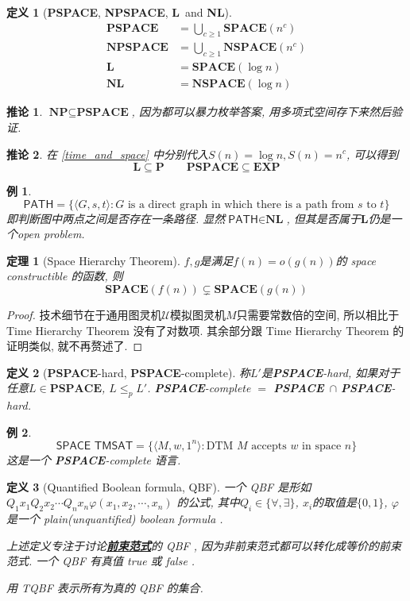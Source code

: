 \documentclass[8pt]{article}
\theoremstyle{compact}
\newtheorem{theorem}{定理}
\newtheorem{definition}{定义}
\newtheorem{corollary}{推论}
\newtheorem{example}{例}
\def\obj#1{\textbf{\uline{#1}}}
\def\le{\leqslant}
\def\ge{\geqslant}
\def\P{\textbf{P}}
\def\NP{\textbf{NP}}
\def\EXP{\textbf{EXP}}
\def\SPACE{\textbf{SPACE}}
\def\NSPACE{\textbf{NSPACE}}
\def\PSPACE{\textbf{PSPACE}}
\def\NPSPACE{\textbf{NPSPACE}}
\def\L{\textbf{L}}
\def\NL{\textbf{NL}}
\begin{document}
\begin{definition}[\PSPACE, \NPSPACE, \L \ and \NL]
	\begin{align*}
		\PSPACE &= \bigcup_{c \ge 1}\SPACE(n^c)\\
		\NPSPACE &= \bigcup_{c \ge 1}\NSPACE(n^c)\\
		\L &= \SPACE(\log n)\\
		\NL &= \NSPACE(\log n)
	\end{align*}
\end{definition}
\begin{corollary}
	$\NP \subseteq \PSPACE$, 因为都可以暴力枚举答案, 用多项式空间存下来然后验证. 
\end{corollary}
\begin{corollary}
	在 \cref{time_and_space} 中分别代入$S(n) = \log n, S(n) = n^c$, 可以得到
	$$\L \subseteq \P\qquad \PSPACE \subseteq \EXP$$
\end{corollary}
\begin{example}
	$$\textsf{PATH} = \{ \langle G, s, t\rangle : G \textrm{ is a direct graph in which there is a path from }s \textrm{ to } t\}$$
	即判断图中两点之间是否存在一条路径. 显然$\textsf{PATH} \in \NL$, 但其是否属于$\L$仍是一个open problem. 
\end{example}
\begin{theorem}[Space Hierarchy Theorem]
	$f, g$是满足$f(n) = o(g(n))$的 space constructible 的函数, 则
	$$\SPACE(f(n)) \subsetneq \SPACE(g(n))$$
\end{theorem}
\begin{proof}
	技术细节在于通用图灵机$\mathcal U$模拟图灵机$M$只需要常数倍的空间, 所以相比于 Time Hierarchy Theorem 没有了对数项. 其余部分跟 Time Hierarchy Theorem 的证明类似, 就不再赘述了. 	
\end{proof}
\begin{definition}[\PSPACE-hard, \PSPACE-complete]
	称$L'$是\PSPACE-hard, 如果对于任意$L \in \PSPACE$, $L \le_p L'$. \PSPACE-complete $=$ \PSPACE\ $\cap$ \PSPACE-hard.  
\end{definition}
\begin{example}
	$$\textsf{SPACE TMSAT} = \{ \langle M, w, 1^n \rangle : \textrm{DTM } M \textrm{ accepts } w \textrm{ in space } n \}$$
	这是一个 \PSPACE-complete 语言. 
\end{example}
\begin{definition}[Quantified Boolean formula, QBF]
	一个 QBF 是形如 $Q_1x_1Q_2x_2 \cdots Q_nx_n \varphi(x_1, x_2, \cdots, x_n)$ 的公式, 其中$Q_i \in \{\forall, \exists\}$, $x_i$的取值是$\{0, 1\}$, $\varphi$是一个 plain(unquantified) boolean formula . 

	上述定义专注于讨论\obj{前束范式}的 QBF , 因为非前束范式都可以转化成等价的前束范式. 一个 QBF 有真值 true 或 false . 

	用 \textsf{TQBF} 表示所有为真的 QBF 的集合. 
\end{definition}
\end{document}
